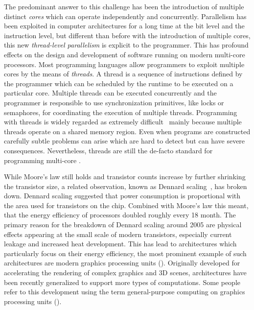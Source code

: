 The predominant answer to this challenge has been the introduction of multiple distinct \emph{cores} which can operate independently and concurrently.
Parallelism has been exploited in computer architectures for a long time at the bit level and the instruction level, but different than before with the introduction of multiple cores, this new \emph{thread-level parallelism} is explicit to the programmer.
This has profound effects on the design and development of software running on modern multi-core processors.
Most programming languages allow programmers to exploit multiple cores by the means of \emph{threads}.
A thread is a sequence of instructions defined by the programmer which can be scheduled by the runtime to be executed on a particular core.
Multiple threads can be executed concurrently and the programmer is responsible to use synchronization primitives, like locks or semaphores, for coordinating the execution of multiple threads.
Programming with threads is widely regarded as extremely difficult~\cite{} mainly because multiple threads operate on a shared memory region.
Even when programs are constructed carefully subtle problems can arise which are hard to detect but can have severe consequences.
Nevertheless, threads are still the de-facto standard for programming multi-core \CPUs.

\bigskip

\noindent
While Moore's law still holds and transistor counts increase by further shrinking the transistor size, a related observation, known as Dennard scaling~\cite{DennardRiBaLe1974}, has broken down.
Dennard scaling suggested that power consumption is proportional with the area used for transistors on the chip.
Combined with Moore's law this meant, that the energy efficiency of processors doubled roughly every 18 month.
The primary reason for the breakdown of Dennard scaling around 2005 are physical effects appearing at the small scale of modern transistors, especially current leakage and increased heat development.
This has lead to architectures which particularly focus on their energy efficiency, the most prominent example of such architectures are modern graphics processing units (\GPUs).
Originally developed for accelerating the rendering of complex graphics and 3D scenes, \GPU architectures have been recently generalized to support more types of computations.
Some people refer to this development using the term general-purpose computing on graphics processing units (\GPGPU).

